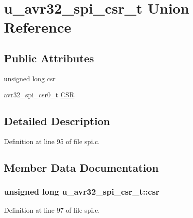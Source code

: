 \hypertarget{unionu__avr32__spi__csr__t}{}\section{u\+\_\+avr32\+\_\+spi\+\_\+csr\+\_\+t Union Reference}
\label{unionu__avr32__spi__csr__t}
\subsection*{Public Attributes}
\begin{DoxyCompactItemize}
\item 
unsigned long \hyperlink{unionu__avr32__spi__csr__t_a119d7f344181184203fc1b94d2058fcf}{csr}
\item 
avr32\+\_\+spi\+\_\+csr0\+\_\+t \hyperlink{unionu__avr32__spi__csr__t_a91cbf745f9d3075ad2c9f1bd628fc687}{C\+S\+R}
\end{DoxyCompactItemize}


\subsection{Detailed Description}


Definition at line 95 of file spi.\+c.



\subsection{Member Data Documentation}
\hypertarget{unionu__avr32__spi__csr__t_a119d7f344181184203fc1b94d2058fcf}{}
\subsubsection[{csr}]{\setlength{\rightskip}{0pt plus 5cm}unsigned long u\+\_\+avr32\+\_\+spi\+\_\+csr\+\_\+t\+::csr}\label{unionu__avr32__spi__csr__t_a119d7f344181184203fc1b94d2058fcf}


Definition at line 97 of file spi.\+c.

\hypertarget{unionu__avr32__spi__csr__t_a91cbf745f9d3075ad2c9f1bd628fc687}{}
